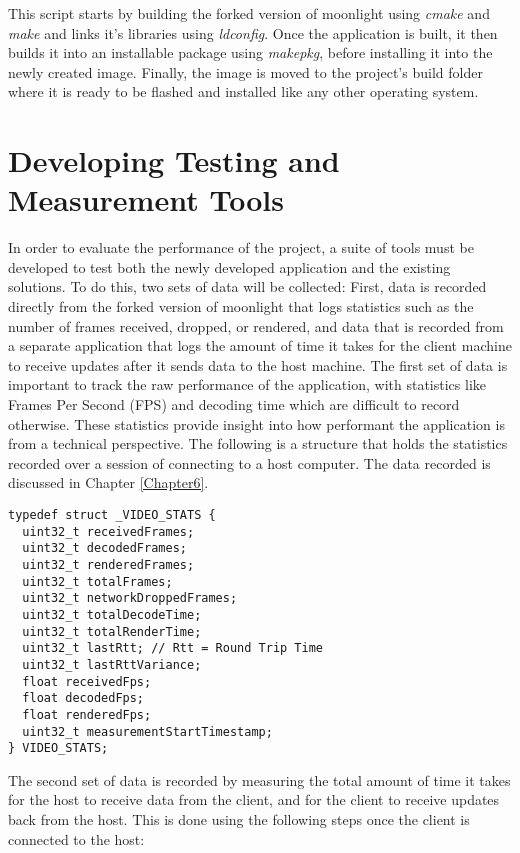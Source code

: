 This script starts by building the forked version of moonlight using \emph{cmake} and \emph{make} and links it's libraries using \emph{ldconfig}.
Once the application is built, it then builds it into an installable package using \emph{makepkg}, before installing it into the newly created image.
Finally, the image is moved to the project's build folder where it is ready to be flashed and installed like any other operating system.


\section{Developing Testing and Measurement Tools}\label{sec:DevelopingTestingAndMeasurementTools}

In order to evaluate the performance of the project, a suite of tools must be developed to test both the newly developed application and the existing solutions.
To do this, two sets of data will be collected: First, data is recorded directly from the forked version of moonlight that logs statistics such as the number of frames received, dropped, or rendered, and data that is recorded from a separate application that logs the amount of time it takes for the client machine to receive updates after it sends data to the host machine.
The first set of data is important to track the raw performance of the application, with statistics like Frames Per Second (FPS) and decoding time which are difficult to record otherwise.
These statistics provide insight into how performant the application is from a technical perspective.
The following is a structure that holds the statistics recorded over a session of connecting to a host computer.
The data recorded is discussed in Chapter \ref{Chapter6}.

\begin{lstlisting}[style=customc,firstnumber=23,title=Excerpt from \emph{moonlight/src/video/stats.h}]
typedef struct _VIDEO_STATS {
  uint32_t receivedFrames;
  uint32_t decodedFrames;
  uint32_t renderedFrames;
  uint32_t totalFrames;
  uint32_t networkDroppedFrames;
  uint32_t totalDecodeTime;
  uint32_t totalRenderTime;
  uint32_t lastRtt; // Rtt = Round Trip Time
  uint32_t lastRttVariance;
  float receivedFps;
  float decodedFps;
  float renderedFps;
  uint32_t measurementStartTimestamp;
} VIDEO_STATS;
\end{lstlisting}

The second set of data is recorded by measuring the total amount of time it takes for the host to receive data from the client, and for the client to receive updates back from the host.
This is done using the following steps once the client is connected to the host:

